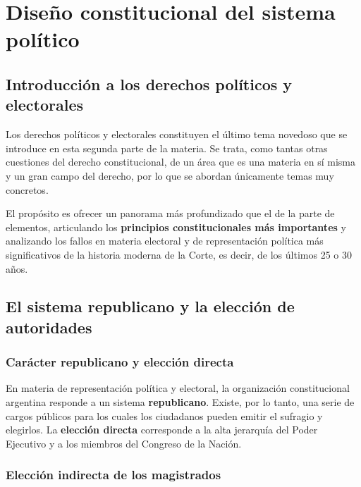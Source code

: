 \documentclass[12pt,oneside]{book}
\begin{document}
\chapter[Diseño constitucional del sistema político]{Diseño constitucional del sistema político}

\section{Introducción a los derechos políticos y electorales}

Los derechos políticos y electorales constituyen el último tema novedoso que se introduce en esta segunda parte de la materia. Se trata, como tantas otras cuestiones del derecho constitucional, de un área que es una materia en sí misma y un gran campo del derecho, por lo que se abordan únicamente temas muy concretos.

El propósito es ofrecer un panorama más profundizado que el de la parte de elementos, articulando los \textbf{principios constitucionales más importantes} y analizando los fallos en materia electoral y de representación política más significativos de la historia moderna de la Corte, es decir, de los últimos 25 o 30 años.

\section{El sistema republicano y la elección de autoridades}

\subsection{Carácter republicano y elección directa}

En materia de representación política y electoral, la organización constitucional argentina responde a un sistema \textbf{republicano}. Existe, por lo tanto, una serie de cargos públicos para los cuales los ciudadanos pueden emitir el sufragio y elegirlos. La \textbf{elección directa} corresponde a la alta jerarquía del Poder Ejecutivo y a los miembros del Congreso de la Nación.

\subsection{Elección indirecta de los magistrados}
\end{document}
